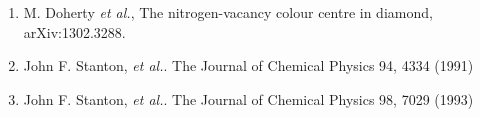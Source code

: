 \begin{enumerate}
  \item
    { M. Doherty \textit{et al.}, The nitrogen-vacancy colour centre
    in diamond, arXiv:1302.3288. }
  \item
    {John F. Stanton, \textit{et al.}.  The Journal of Chemical Physics
    94, 4334 (1991)}
  \item
    {John F. Stanton, \textit{et al.}.  The Journal of Chemical Physics
    98, 7029 (1993)}
\end{enumerate}

